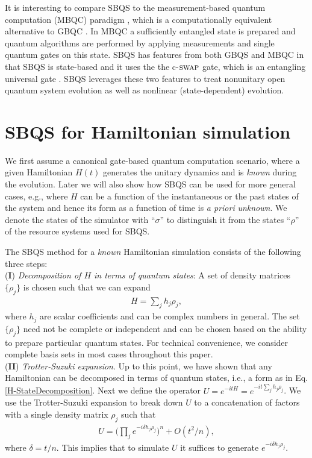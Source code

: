 \documentclass[aps,pra,twocolumn,floatfix,groupedaddress,superscriptaddress,nofootinbib,notitlepage]{revtex4-2}
\begin{document}
It is interesting to compare SBQS to the measurement-based quantum computation (MBQC) paradigm \cite{MBQC1, MBQC2}, which is a computationally equivalent alternative to GBQC \cite{MBQC-equiv-CBQC1, MBQC-equiv-CBQC2}. In MBQC a sufficiently entangled state is prepared and quantum algorithms are performed by applying measurements and single quantum gates on this state. SBQS has features from both GBQS and MBQC in that SBQS is state-based and it uses the the c-$\textsc{swap}$ gate, which is an entangling universal gate \cite{Book:Nielsen-Chuang}. SBQS leverages these two features to treat nonunitary open quantum system evolution as well as nonlinear (state-dependent) evolution. 

\section{SBQS for Hamiltonian simulation}
\label{sec:sbqs}

We first assume a canonical gate-based quantum computation scenario, where a given Hamiltonian $H(t)$ generates the unitary dynamics and is \textit{known} during the evolution. Later we will also show how SBQS can be used for more general cases, e.g., where $H$ can be a function of the instantaneous or the past states of the system and hence its form as a function of time is \textit{a priori} \textit{unknown}. We denote the states of the simulator with ``$\sigma$'' to distinguish it from the states ``$\rho$'' of the resource systems used for SBQS.
 
The SBQS method for a \textit{known} Hamiltonian simulation consists of the following three steps:\\

(\textbf{I}) \textit{Decomposition of $H$ in terms of quantum states}: A set of density matrices $\{\rho_{j}\}$ is chosen such that we can expand 
\begin{align}
H=\textstyle{\sum}_{j} h_{j} \rho_{j},
\label{H-StateDecomposition}
\end{align}
where $h_{j}$ are scalar coefficients and can be complex numbers in general. The set $\{\rho_{j}\}$ need not be complete or independent and can be chosen based on the ability to prepare particular quantum states. For technical convenience, we consider complete basis sets in most cases throughout this paper.\\

(\textbf{II}) \textit{Trotter-Suzuki expansion}. Up to this point, we have shown that any Hamiltonian can be decomposed in terms of quantum states, i.e., a form as in Eq. \eqref{H-StateDecomposition}. Next we define the operator $U=e^{-i t H}= e^{-i t \sum_{j} h_{j} \rho_{j}}$. We use the Trotter-Suzuki expansion to break down $U$ to a concatenation of factors with a single density matrix $\rho_{j}$ such that \cite{Lloyd:UQS}
\begin{align}
U = \big(\textstyle{\prod}_{j} e^{-i \delta h_{j} \rho_{j}}\big)^{n}+O(t^{2}/n),
\label{U-Trotter}
\end{align}
where $\delta= t/n$. This implies that to simulate $U$ it suffices to generate $e^{-i \delta h_{j} \rho_{j}}$.\\
\end{document}
